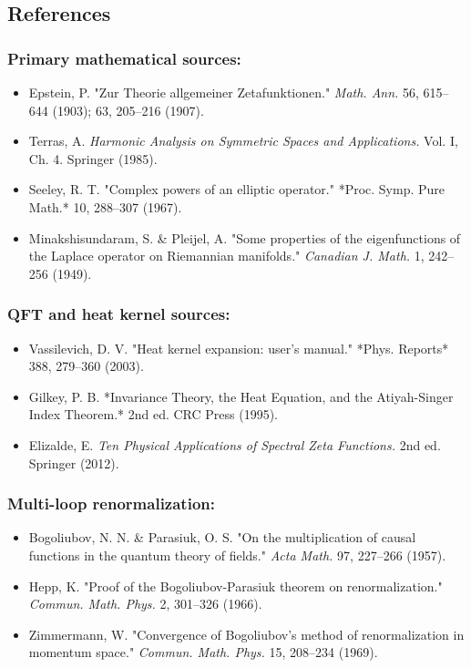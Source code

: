 \documentclass[aps,prd,preprint,superscriptaddress,longbibliography,floatfix]{revtex4-2}
\theoremstyle{remark}
\begin{document}
\subsection{References}


\subsubsection{Primary mathematical sources:}

\begin{itemize}
  \item Epstein, P. "Zur Theorie allgemeiner Zetafunktionen." \textit{Math. Ann.} 56, 615--644 (1903); 63, 205--216 (1907).
  \item Terras, A. \textit{Harmonic Analysis on Symmetric Spaces and Applications.} Vol. I, Ch. 4. Springer (1985).
  \item Seeley, R. T. "Complex powers of an elliptic operator." *Proc. Symp. Pure Math.* 10, 288--307 (1967).
  \item Minakshisundaram, S. \& Pleijel, A. "Some properties of the eigenfunctions of the Laplace operator on Riemannian manifolds." \textit{Canadian J. Math.} 1, 242--256 (1949).
\end{itemize}


\subsubsection{QFT and heat kernel sources:}

\begin{itemize}
  \item Vassilevich, D. V. "Heat kernel expansion: user's manual." *Phys. Reports* 388, 279--360 (2003).
  \item Gilkey, P. B. *Invariance Theory, the Heat Equation, and the Atiyah-Singer Index Theorem.* 2nd ed. CRC Press (1995).
  \item Elizalde, E. \textit{Ten Physical Applications of Spectral Zeta Functions.} 2nd ed. Springer (2012).
\end{itemize}


\subsubsection{Multi-loop renormalization:}

\begin{itemize}
  \item Bogoliubov, N. N. \& Parasiuk, O. S. "On the multiplication of causal functions in the quantum theory of fields." \textit{Acta Math.} 97, 227--266 (1957).
  \item Hepp, K. "Proof of the Bogoliubov-Parasiuk theorem on renormalization." \textit{Commun. Math. Phys.} 2, 301--326 (1966).
  \item Zimmermann, W. "Convergence of Bogoliubov's method of renormalization in momentum space." \textit{Commun. Math. Phys.} 15, 208--234 (1969).
\end{itemize}
\end{document}
